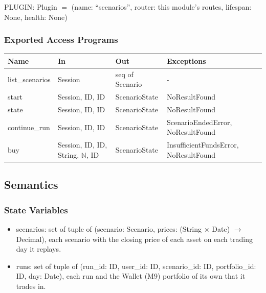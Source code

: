 \documentclass[12pt, titlepage]{article}
\begin{document}
\noindent PLUGIN: Plugin $=$ (name: ``scenarios'', router: this module's
routes, lifespan: None, health: None)

\subsubsection{Exported Access Programs}

\begin{center}
\small
\setlength{\tabcolsep}{3pt}
\begin{tabular}{>{\raggedright\arraybackslash}p{3.9cm}
  >{\raggedright\arraybackslash}p{3.7cm}
  >{\raggedright\arraybackslash}p{3.4cm}
  >{\raggedright\arraybackslash}p{4.3cm}}
\toprule
\textbf{Name} & \textbf{In} & \textbf{Out} & \textbf{Exceptions} \\
\midrule
list\_scenarios & Session & seq of Scenario & - \\
start & Session, ID, ID & ScenarioState & NoResultFound \\
state & Session, ID, ID & ScenarioState & NoResultFound \\
continue\_run & Session, ID, ID & ScenarioState & ScenarioEndedError,
NoResultFound \\
buy & Session, ID, ID, String, $\mathbb{N}$, ID & ScenarioState &
InsufficientFundsError, NoResultFound \\
\bottomrule
\end{tabular}
\end{center}

\subsection{Semantics}

\subsubsection{State Variables}

\begin{itemize}
\item scenarios: set of tuple of (scenario: Scenario, prices: (String
  $\times$ Date) $\rightarrow$ Decimal), each scenario with the closing price
  of each asset on each trading day it replays.
\item runs: set of tuple of (run\_id: ID, user\_id: ID, scenario\_id: ID,
  portfolio\_id: ID, day: Date), each run and the Wallet (M9) portfolio of its
  own that it trades in.
\end{itemize}
\end{document}
